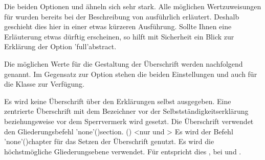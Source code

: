 \begin{DeclareEntity*}{}
\begin{DeclareEntity*}{}
\begin{DeclareEntity*}{}
\begin{Declaration}
Die beiden Optionen  und  ähneln sich sehr 
stark. Alle möglichen Wertzuweisungen für  wurden bereits 
bei der Beschreibung von  ausführlich erläutert. Deshalb 
geschieht dies hier in einer etwas kürzeren Ausführung. Sollte Ihnen eine 
Erläuterung etwas dürftig erscheinen, so hilft mit Sicherheit ein Blick zur 
Erklärung der Option \Option'full'{abstract}.

Die möglichen Werte für die Gestaltung der Überschrift werden nachfolgend 
genannt. Im Gegensatz zur Option  stehen die beiden 
Einstellungen  und  auch für 
die Klasse  zur Verfügung.
\begin{DeclareValues}{}
  Es wird keine Überschrift über den Erklärungen selbst ausgegeben.
  Eine zentrierte Überschrift mit dem Bezeichner  vor 
  der Selbstständigkeitserklärung beziehungsweise  vor dem 
  Sperrvermerk wird gesetzt. 
  Die Überschrift verwendet den Gliederungsbefehl 
  \Macro'none'(){section}.
()
    <nur  und >
  Es wird der Befehl \Macro'none'(){chapter} für das 
  Setzen der Überschrift genutzt. 
  Es wird die höchstmögliche Gliederungsebene verwendet. Für 
   entspricht dies , bei 
   und  .
\end{DeclareValues}


\end{Declaration}
\end{DeclareEntity*}
\end{DeclareEntity*}
\end{DeclareEntity*}
